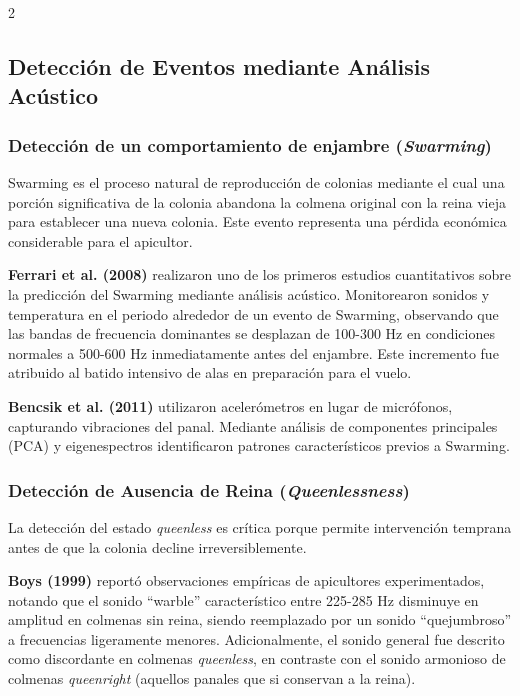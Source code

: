 \documentclass[12pt]{report}
\newenvironment{tightmulticols}{%
  \begin{multicols}{2}
  \setlength{\parskip}{1.2pt}
  \linespread{1}\selectfont
}{%
  \end{multicols}
}
\begin{document}
\pagebreak

\begin{tightmulticols}

\subsection{Detección de Eventos mediante Análisis Acústico}

\subsubsection{Detección de un comportamiento de enjambre (\textit{Swarming})}

\noindent Swarming es el proceso natural de reproducción de colonias mediante el cual una porción significativa de la colonia abandona la colmena original con la reina vieja para establecer una nueva colonia. Este evento representa una pérdida económica considerable para el apicultor.\\

\par\textbf{Ferrari et al. (2008)}\cite{ferrari2008} realizaron uno de los primeros estudios cuantitativos sobre la predicción del Swarming mediante análisis acústico. Monitorearon sonidos y temperatura en el periodo alrededor de un evento de Swarming, observando que las bandas de frecuencia dominantes se desplazan de 100-300 Hz en condiciones normales a 500-600 Hz inmediatamente antes del enjambre. Este incremento fue atribuido al batido intensivo de alas en preparación para el vuelo.\\

\par\textbf{Bencsik et al. (2011)} utilizaron acelerómetros en lugar de micrófonos, capturando vibraciones del panal. Mediante análisis de componentes principales (PCA) y eigenespectros identificaron patrones característicos previos a Swarming.

\subsubsection{Detección de Ausencia de Reina (\textit{Queenlessness})}

\noindent La detección del estado \textit{queenless} es crítica porque permite intervención temprana antes de que la colonia decline irreversiblemente.\\

\par \textbf{Boys (1999)} reportó observaciones empíricas de apicultores experimentados, notando que el sonido ``warble'' característico entre 225-285 Hz disminuye en amplitud en colmenas sin reina, siendo reemplazado por un sonido ``quejumbroso'' a frecuencias ligeramente menores. Adicionalmente, el sonido general fue descrito como discordante en colmenas \textit{queenless}, en contraste con el sonido armonioso de colmenas \textit{queenright} (aquellos panales que si conservan a la reina).\\


\end{tightmulticols}
\end{document}
